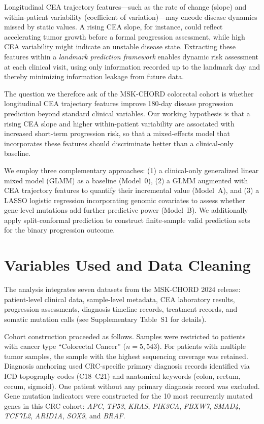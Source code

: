 \documentclass[11pt]{article}
\begin{document}
Longitudinal CEA trajectory features---such as the rate of change (slope) and within-patient variability (coefficient of variation)---may encode disease dynamics missed by static values. A rising CEA slope, for instance, could reflect accelerating tumor growth before a formal progression assessment, while high CEA variability might indicate an unstable disease state. Extracting these features within a \emph{landmark prediction framework} enables dynamic risk assessment at each clinical visit, using only information recorded up to the landmark day and thereby minimizing information leakage from future data.

The question we therefore ask of the MSK-CHORD colorectal cohort is whether longitudinal CEA trajectory features improve 180-day disease progression prediction beyond standard clinical variables. Our working hypothesis is that a rising CEA slope and higher within-patient variability are associated with increased short-term progression risk, so that a mixed-effects model that incorporates these features should discriminate better than a clinical-only baseline.

We employ three complementary approaches: (1) a clinical-only generalized linear mixed model (GLMM) as a baseline (Model~0), (2) a GLMM augmented with CEA trajectory features to quantify their incremental value (Model~A), and (3) a LASSO logistic regression incorporating genomic covariates to assess whether gene-level mutations add further predictive power (Model~B). We additionally apply split-conformal prediction to construct finite-sample valid prediction sets for the binary progression outcome.

\section{Variables Used and Data Cleaning}

The analysis integrates seven datasets from the MSK-CHORD 2024 release: patient-level clinical data, sample-level metadata, CEA laboratory results, progression assessments, diagnosis timeline records, treatment records, and somatic mutation calls (see Supplementary Table~S1 for details).

Cohort construction proceeded as follows. Samples were restricted to patients with cancer type ``Colorectal Cancer'' ($n = 5{,}543$). For patients with multiple tumor samples, the sample with the highest sequencing coverage was retained. Diagnosis anchoring used CRC-specific primary diagnosis records identified via ICD topography codes (C18--C21) and anatomical keywords (colon, rectum, cecum, sigmoid). One patient without any primary diagnosis record was excluded. Gene mutation indicators were constructed for the 10 most recurrently mutated genes in this CRC cohort: \textit{APC}, \textit{TP53}, \textit{KRAS}, \textit{PIK3CA}, \textit{FBXW7}, \textit{SMAD4}, \textit{TCF7L2}, \textit{ARID1A}, \textit{SOX9}, and \textit{BRAF}.
\end{document}
